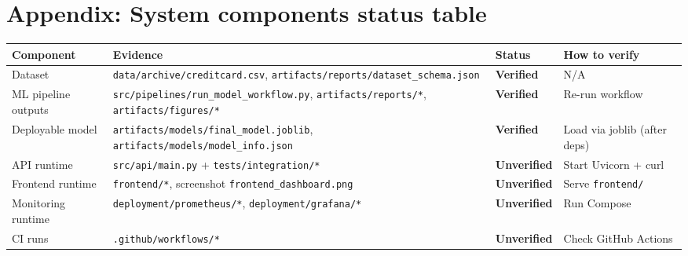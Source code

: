 \documentclass[11pt]{article}
\newcommand{\code}[1]{\texttt{#1}}
\newcommand{\statusverified}{\textbf{Verified}}
\newcommand{\statusunverified}{\textbf{Unverified}}
\begin{document}
\section*{Appendix: System components status table}

\begin{longtable}{p{} p{} p{} p{}}
\toprule
\textbf{Component} & \textbf{Evidence} & \textbf{Status} & \textbf{How to verify} \\
\midrule
\endhead

Dataset & \code{data/archive/creditcard.csv}, \code{artifacts/reports/dataset_schema.json} & \statusverified{} & N/A \\
ML pipeline outputs & \code{src/pipelines/run_model_workflow.py}, \code{artifacts/reports/*}, \code{artifacts/figures/*} & \statusverified{} & Re-run workflow \\
Deployable model & \code{artifacts/models/final_model.joblib}, \code{artifacts/models/model_info.json} & \statusverified{} & Load via joblib (after deps) \\
API runtime & \code{src/api/main.py} + \code{tests/integration/*} & \statusunverified{} & Start Uvicorn + curl \\
Frontend runtime & \code{frontend/*}, screenshot \code{frontend_dashboard.png} & \statusunverified{} & Serve \code{frontend/} \\
Monitoring runtime & \code{deployment/prometheus/*}, \code{deployment/grafana/*} & \statusunverified{} & Run Compose \\
CI runs & \code{.github/workflows/*} & \statusunverified{} & Check GitHub Actions \\
\bottomrule
\end{longtable}
\end{document}
